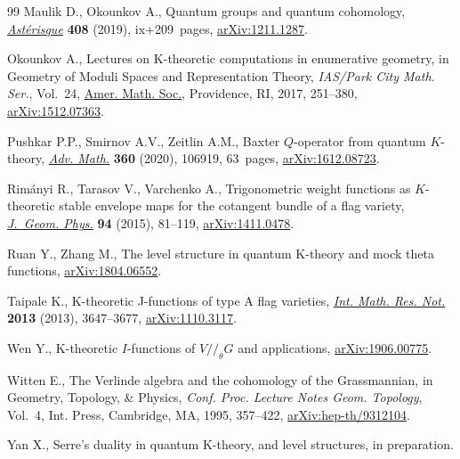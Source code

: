 \documentclass[pdftex]{sigma}
\numberwithin{equation}{section}
\begin{document}
\begin{thebibliography}{99}
Maulik D., Okounkov A., Quantum groups and quantum cohomology,
 \href{https://doi.org/10.24033/ast}{\textit{Ast\'erisque}} \textbf{408} (2019), ix+209~pages, \href{https://arxiv.org/abs/1211.1287}{arXiv:1211.1287}.

Okounkov A., Lectures on {K}-theoretic computations in enumerative geometry, in
 Geometry of Moduli Spaces and Representation Theory, \textit{IAS/Park City
 Math. Ser.}, Vol.~24, \href{https://doi.org/10.1090/pcms/024}{Amer. Math. Soc.}, Providence, RI, 2017, 251--380,
 \href{https://arxiv.org/abs/1512.07363}{arXiv:1512.07363}.

Pushkar P.P., Smirnov A.V., Zeitlin A.M., Baxter {$Q$}-operator from quantum
 {$K$}-theory, \href{https://doi.org/10.1016/j.aim.2019.106919}{\textit{Adv. Math.}} \textbf{360} (2020), 106919, 63~pages,
 \href{https://arxiv.org/abs/1612.08723}{arXiv:1612.08723}.

Rim\'anyi R., Tarasov V., Varchenko A., Trigonometric weight functions as
 {$K$}-theoretic stable envelope maps for the cotangent bundle of a flag
 variety, \href{https://doi.org/10.1016/j.geomphys.2015.04.002}{\textit{J.~Geom. Phys.}} \textbf{94} (2015), 81--119,
 \href{https://arxiv.org/abs/1411.0478}{arXiv:1411.0478}.

Ruan Y., Zhang M., The level structure in quantum {K}-theory and mock theta
 functions, \href{https://arxiv.org/abs/1804.06552}{arXiv:1804.06552}.

Taipale K., K-theoretic {J}-functions of type {A} flag varieties, \href{https://doi.org/10.1093/imrn/rns156}{\textit{Int.
 Math. Res. Not.}} \textbf{2013} (2013), 3647--3677, \href{https://arxiv.org/abs/1110.3117}{arXiv:1110.3117}.

Wen Y., {K}-theoretic {$I$}-functions of {$V//_{\theta}G$} and applications,
 \href{https://arxiv.org/abs/1906.00775}{arXiv:1906.00775}.

Witten E., The {V}erlinde algebra and the cohomology of the {G}rassmannian, in
 Geometry, Topology, \& Physics, \textit{Conf. Proc. Lecture Notes Geom.
 Topology}, Vol.~4, Int. Press, Cambridge, MA, 1995, 357--422,
 \href{https://arxiv.org/abs/hep-th/9312104}{arXiv:hep-th/9312104}.

Yan X., Serre's duality in quantum {K}-theory, and level structures, in
 preparation.

\end{thebibliography}\LastPageEnding
\end{document}
